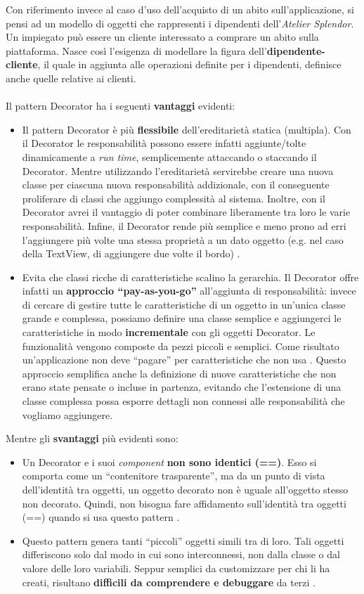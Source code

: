\documentclass[12pt]{article}
\begin{document}
Con riferimento invece al caso d'uso dell'acquisto di un abito sull'applicazione, si pensi ad un modello di oggetti che rappresenti i dipendenti dell'{\em Atelier Splendor}. Un impiegato può essere un cliente interessato a comprare un abito sulla piattaforma. Nasce così l'esigenza di modellare la figura dell'\textbf{dipendente-cliente}, il quale in aggiunta alle operazioni definite per i dipendenti, definisce anche quelle relative ai clienti.
\\
\\
Il pattern Decorator ha i seguenti \textbf{vantaggi} evidenti:
\begin{itemize}
    \item Il pattern Decorator è più \textbf{flessibile} dell'ereditarietà statica (multipla). Con il Decorator le responsabilità possono essere infatti aggiunte/tolte dinamicamente a {\em run time}, semplicemente attaccando o staccando il Decorator. Mentre utilizzando l'ereditarietà servirebbe creare una nuova classe per ciascuna nuova responsabilità addizionale, con il conseguente proliferare di classi che aggiungo complessità al sistema. Inoltre, con il Decorator avrei il vantaggio di poter combinare liberamente tra loro le varie responsabilità. Infine, il Decorator rende più semplice e meno prono ad erri l'aggiungere più volte una stessa proprietà a un dato oggetto (e.g. nel caso della TextView, di aggiungere due volte il bordo) \cite{gof_riferimento}.
    \item Evita che classi ricche di caratteristiche scalino la gerarchia. Il Decorator offre infatti un \textbf{approccio ``pay-as-you-go''} all'aggiunta di responsabilità: invece di cercare di gestire tutte le caratteristiche di un oggetto in un'unica classe grande e complessa, possiamo definire una classe semplice e aggiungerci le caratteristiche in modo \textbf{incrementale} con gli oggetti Decorator. Le funzionalità vengono composte da pezzi piccoli e semplici.
    Come risultato un'applicazione non deve ``pagare'' per caratteristiche che non usa \cite{gof_riferimento}.
    Questo approccio semplifica anche la definizione di nuove caratteristiche che non erano state pensate o incluse in partenza, evitando che l'estensione di una classe complessa possa esporre dettagli non connessi alle responsabilità che vogliamo aggiungere.
\end{itemize}
Mentre gli \textbf{svantaggi} più evidenti sono:
\begin{itemize}
    \item Un Decorator e i suoi {\em component} \textbf{non sono identici (==)}. Esso si comporta come un ``contenitore trasparente'', ma da un punto di vista dell'identità tra oggetti, un oggetto decorato non è uguale all'oggetto stesso non decorato. Quindi, non bisogna fare affidamento sull'identità tra oggetti (==) quando si usa questo pattern \cite{gof_sunt}.
    \item Questo pattern genera tanti ``piccoli'' oggetti simili tra di loro. Tali oggetti differiscono solo dal modo in cui sono interconnessi, non dalla classe o dal valore delle loro variabili. Seppur semplici da customizzare per chi li ha creati, risultano \textbf{difficili da comprendere e debuggare} da terzi \cite{gof_riferimento}.
\end{itemize}
\end{document}

